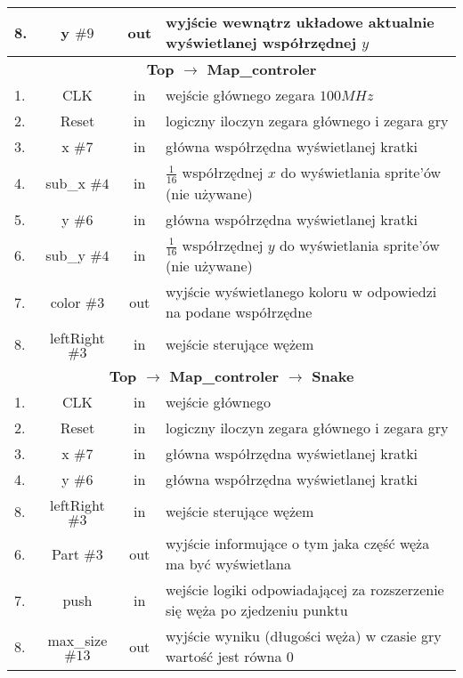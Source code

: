 \begin{table}[!ht]
\begin{tabularx}{\textwidth}{|l|c|c|X|}
            8. & y $\#9$& out & wyjście wewnątrz układowe aktualnie wyświetlanej współrzędnej $y$ \\\hline
            \hline
            \multicolumn{4}{|c|}{\textbf{Top $\rightarrow$ Map\_controler}}\\\hline
            1. & CLK         & in  & wejście głównego zegara $100MHz$ \\\hline
            2. & Reset       & in  & logiczny iloczyn zegara głównego i zegara gry\\\hline
            3. & x $\#7$     & in  & główna współrzędna wyświetlanej kratki\\\hline
            4. & sub\_x $\#4$& in  & $\frac{1}{16}$ współrzędnej $x$ do wyświetlania sprite'ów (nie używane)\\\hline
            5. & y $\#6$     & in  & główna współrzędna wyświetlanej kratki\\\hline
            6. & sub\_y $\#4$& in  & $\frac{1}{16}$ współrzędnej $y$ do wyświetlania sprite'ów (nie używane)\\\hline
            7. & color $\#3$ & out & wyjście wyświetlanego koloru w odpowiedzi na podane współrzędne\\\hline
            8. & leftRight$\#3$& in  & wejście sterujące wężem \\\hline
            \hline
            \multicolumn{4}{|c|}{\textbf{Top $\rightarrow$ Map\_controler $\rightarrow$ Snake}}\\\hline
            1. & CLK         & in  & wejście głównego \\\hline
            2. & Reset       & in  & logiczny iloczyn zegara głównego i zegara gry\\\hline
            3. & x $\#7$     & in  & główna współrzędna wyświetlanej kratki\\\hline
            4. & y $\#6$     & in  & główna współrzędna wyświetlanej kratki\\\hline
            8. & leftRight$\#3$& in  & wejście sterujące wężem \\\hline
            6. & Part $\#3$  & out & wyjście informujące o tym jaka część węża ma być wyświetlana \\\hline
            7. & push        & in  & wejście logiki odpowiadającej za rozszerzenie się węża po zjedzeniu punktu \\\hline
            8. & max\_size$\#13$& out & wyjście wyniku (długości węża) w czasie gry wartość jest równa 0 \\\hline
        \end{tabularx}
    \end{table}
